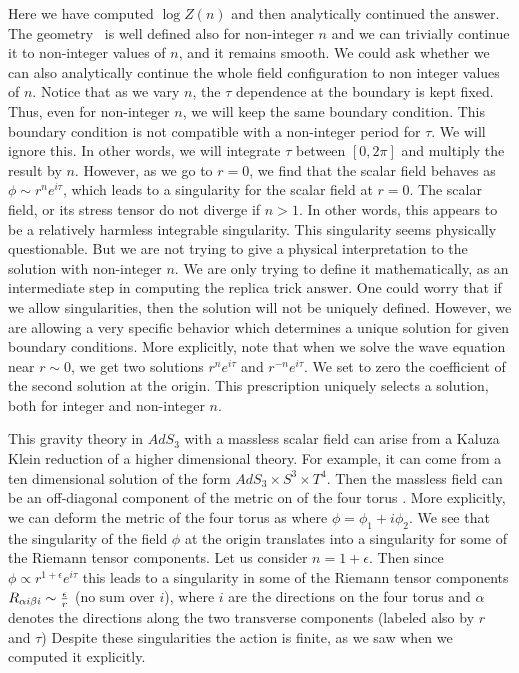 Here we have computed $\log Z(n)$ and then analytically continued the answer.
 The geometry \intb\ is well defined also for non-integer $n$ and
we can trivially continue it to non-integer values of $n$, and it remains smooth.
We could ask whether we can also
 analytically continue the whole field configuration to  non integer values of $n$.
Notice that as we vary $n$, the $\tau$ dependence at the boundary is kept fixed. Thus, even for non-integer $n$,
we will keep the same boundary condition. This boundary condition is not compatible with a non-integer period
for $\tau$. We will ignore this. In other words, we will integrate $\tau$ between $[0,2\pi]$ and multiply the result by $n$.
However, as we go to $r=0$, we find that the scalar field behaves as $\phi \sim r^n e^{ i \tau } $,
which leads to a singularity for the scalar field at $r=0$. The scalar field, or its stress tensor do not
diverge if $n>1$. In other words, this appears to be a relatively harmless integrable singularity.
 This singularity seems physically questionable.  But we are not trying to give a physical interpretation to the
 solution with non-integer $n$. We are only trying to define it mathematically, as an intermediate step in
 computing the replica trick answer. One could worry that if we allow singularities, then the solution will not be
 uniquely defined. However, we are allowing a very specific behavior which determines a unique solution for given
 boundary conditions. More explicitly, note that when we solve the wave equation near $r\sim 0$, we get two
 solutions $ r^n e^{ i \tau} $ and $r^{-n} e^{ i \tau }$. We set to zero the coefficient of the second solution at
 the origin. This  prescription uniquely selects a solution, both for integer and non-integer $n$.


This gravity  theory in $AdS_3$ with a massless scalar field can arise  from a
Kaluza Klein reduction of a higher dimensional theory. For example, it can come from a ten dimensional
solution of the form
$AdS_3 \times S^3 \times T^4$. Then the massless field can be an off-diagonal component of the
metric on of the four torus .
 More explicitly,  we can deform the metric of the four torus as
 \eqn{}
 where $\phi = \phi_1 + i \phi_2$.
  We   see that
 the singularity of the field $\phi$ at the origin translates into a singularity for some of the Riemann tensor components.
 Let us consider $n = 1 + \epsilon$. Then since  $\phi \propto r^{ 1 + \epsilon } e^{ i \tau} $ this leads to
 a singularity in some of the Riemann tensor components  $R_{ \alpha  i \beta i} \sim {\epsilon \over r}$  (no sum over $i$), where $i$ are the directions on the four torus and $\alpha $ denotes the directions along the two transverse components (labeled also
 by $r$ and $\tau$)
 Despite these singularities the action is finite, as we saw when we computed it explicitly.




